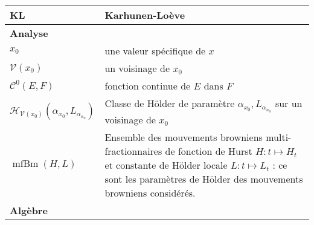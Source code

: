 \begin{table}[H]
\begin{tabularx}{\textwidth}{lX}
		KL                                                               & Karhunen-Loève                                                                                                                                                                                                                    \\
		\midrule
		\textbf{Analyse}                                                 &                                                                                                                                                                                                                                   \\
		\midrule
		$x_0$                                                            & une valeur spécifique de $x$                                                                                                                                                                                                      \\
		$\mathcal{V}(x_0)$                                               & un voisinage de $x_0$                                                                                                                                                                                                             \\
		$\mathcal C^0(E, F)$                                             & fonction continue de $E$ dans $F$                                                                                                                                                                                                 \\
		$\mathcal{H}_{\mathcal{V}(x_0)}(\alpha_{x_0}, L_{\alpha_{x_0}})$ & Classe de Hölder de paramètre $\alpha_{x_0}, L_{\alpha_{x_0}}$ sur un voisinage de $x_0$                                                                                                                                          \\
		$\operatorname{mfBm}(H, L)$                                      & Ensemble des mouvements browniens multi-fractionnaires de fonction de Hurst $H : t \mapsto H_t$ et constante de Hölder locale $L : t \mapsto L_t$ : ce sont les \og paramètres de Hölder \fg des mouvements browniens considérés. \\
		\midrule
		\textbf{Algèbre}                                                 &                                                                                                                                                                                                                                   \\

\end{tabularx}
\end{table}

